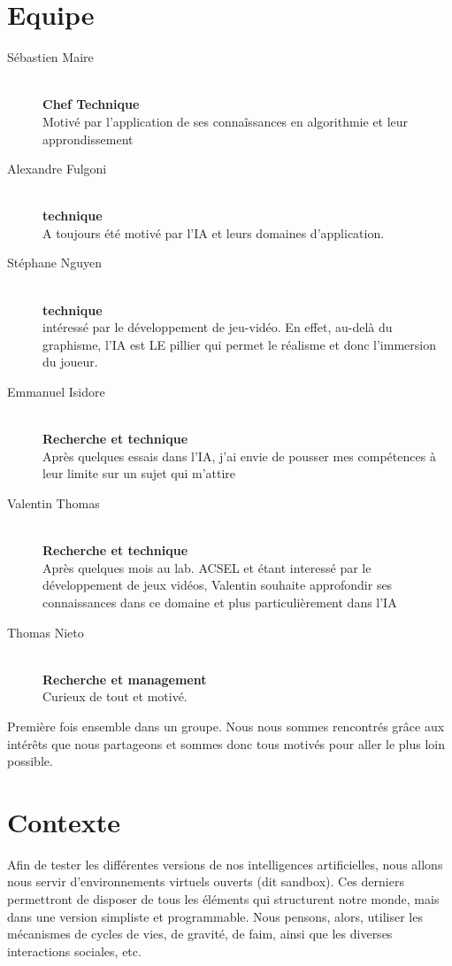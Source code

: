 \documentclass[a4paper]{report}
\begin{document}
  \section*{Equipe}
    \begin{description}
      \item[Sébastien Maire] \hfill \\
        \textbf{Chef Technique} \\
        Motivé par l'application de ses connaîssances en algorithmie et leur approndissement
      \item[Alexandre Fulgoni] \hfill \\
        \textbf{technique} \\
        A toujours été motivé par l'IA et leurs domaines d'application.
      \item[Stéphane Nguyen] \hfill \\
        \textbf{technique} \\
        intéressé par le développement de jeu-vidéo. En effet,
        au-delà du graphisme, l’IA est LE pillier qui permet le réalisme
        et donc l’immersion du joueur.
      \item[Emmanuel Isidore] \hfill \\
        \textbf{Recherche et technique} \\
       Après quelques essais dans l'IA, j'ai envie de pousser mes comp\'etences à leur limite sur un sujet qui m'attire
      \item[Valentin Thomas] \hfill \\
         \textbf{Recherche et technique} \\
         Après quelques mois au lab. ACSEL et \'etant interess\'e par le d\'eveloppement de jeux vid\'eos, Valentin souhaite approfondir ses connaissances dans ce domaine et plus particulièrement dans l'IA
      \item[Thomas Nieto] \hfill \\
        \textbf{Recherche et management} \\
        Curieux de tout et motivé.
    \end{description}

  \noindent
  Première fois ensemble dans un groupe. Nous nous sommes rencontrés grâce aux
  intérêts que nous partageons et sommes donc tous motivés pour aller le plus
  loin possible.

  \section*{Contexte}
  Afin de tester les différentes versions de nos intelligences artificielles, nous allons nous servir d'environnements virtuels ouverts (dit sandbox).
  Ces derniers permettront de disposer de tous les éléments qui structurent notre monde, mais dans une version simpliste et programmable.
  Nous pensons, alors, utiliser les mécanismes de cycles de vies, de gravité, de faim, ainsi que les diverses interactions sociales, etc.
\end{document}
